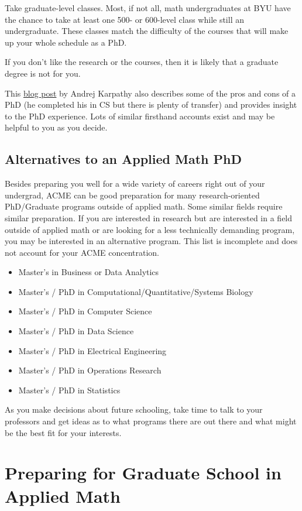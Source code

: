 \documentclass[11pt]{article}
\begin{document}
Take graduate-level classes. Most, if not all, math undergraduates at BYU have the chance to take at least one 500- or 600-level class while still an undergraduate. These classes match the difficulty of the courses that will make up your whole schedule as a PhD.

If you don't like the research or the courses, then it is likely that a graduate degree is not for you.

This \href{https://karpathy.github.io/2016/09/07/phd/}{blog post} by Andrej Karpathy also describes some of the pros and cons of a PhD (he completed his in CS but there is plenty of transfer) and provides insight to the PhD experience. Lots of similar firsthand accounts exist and may be helpful to you as you decide.

\subsection{Alternatives to an Applied Math PhD}
Besides preparing you well for a wide variety of careers right out of your undergrad, ACME can be good preparation for many research-oriented PhD/Graduate programs outside of applied math. Some similar fields require similar preparation. If you are interested in research but are interested in a field outside of applied math or are looking for a less technically demanding program, you may be interested in an alternative program. This list is incomplete and does not account for your ACME concentration.
\begin{itemize}
\item Master’s in Business or Data Analytics
\item Master’s / PhD in Computational/Quantitative/Systems Biology
\item Master’s / PhD in Computer Science
\item Master’s / PhD in Data Science
\item Master’s / PhD in Electrical Engineering
\item Master’s / PhD in Operations Research
\item Master’s / PhD in Statistics
\end{itemize}

As you make decisions about future schooling, take time to talk to your professors and get ideas as to what programs there are out there and what might be the best fit for your interests.

\newpage

\section{Preparing for Graduate School in Applied Math}
\end{document}
